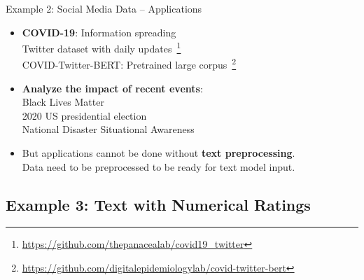 \documentclass{beamer}
\renewcommand{\cite}{\citep}
\begin{document}

\begin{frame}{Example 2: Social Media Data -- Applications}
\begin{itemize}
\item \textbf{COVID-19}: Information spreading~\cite{cinelli2020covid}\\
Twitter dataset with daily updates~\cite{banda2020large}\footnote{\url{https://github.com/thepanacealab/covid19_twitter}}\\
COVID-Twitter-BERT: Pretrained large corpus{\small~\cite{muller2020covid}\footnote{\url{https://github.com/digitalepidemiologylab/covid-twitter-bert}}}
	\bigskip
\item \textbf{Analyze the impact of recent events}:\\
	Black Lives Matter~\cite{giorgi2020twitter}\\
	2020 US presidential election~\cite{chen2020election2020}\\
	National Disaster Situational Awareness~\cite{karami2020twitter}
	\bigskip
\item But applications cannot be done without \textbf{text preprocessing}.\\
	Data need to be preprocessed to be ready for text model input.
\end{itemize}
\end{frame}

\subsection{Example 3: Text with Numerical Ratings}
\end{document}

